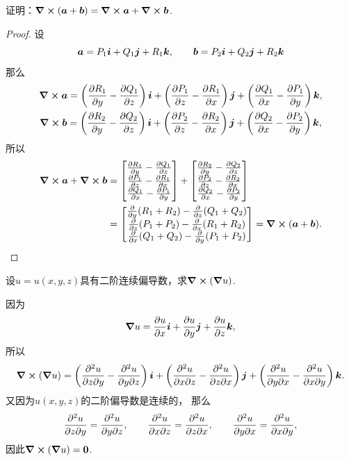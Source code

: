 \begin{example}
证明：\(\curl(\boldsymbol{a}+\boldsymbol{b}) = \curl\boldsymbol{a} + \curl\boldsymbol{b}\).
\begin{proof}
设\begin{equation*}
	\boldsymbol{a}=P_1\boldsymbol{i}+Q_1\boldsymbol{j}+R_1\boldsymbol{k}, \qquad
	\boldsymbol{b}=P_2\boldsymbol{i}+Q_2\boldsymbol{j}+R_2\boldsymbol{k}
\end{equation*}
那么\begin{gather*}
	\curl{\boldsymbol{a}}
	=\left( \pdv{R_1}{y} - \pdv{Q_1}{z} \right)\boldsymbol{i}
	+\left( \pdv{P_1}{z} - \pdv{R_1}{x} \right)\boldsymbol{j}
	+\left( \pdv{Q_1}{x} - \pdv{P_1}{y} \right)\boldsymbol{k}, \\
	\curl{\boldsymbol{b}}
	=\left( \pdv{R_2}{y} - \pdv{Q_2}{z} \right)\boldsymbol{i}
	+\left( \pdv{P_2}{z} - \pdv{R_2}{x} \right)\boldsymbol{j}
	+\left( \pdv{Q_2}{x} - \pdv{P_2}{y} \right)\boldsymbol{k},
\end{gather*}
所以{\def\arraystretch{1.5}
\begin{align*}
	\curl{\boldsymbol{a}} + \curl{\boldsymbol{b}}
	&= \begin{bmatrix}
		\pdv{R_1}{y} - \pdv{Q_1}{z} \\
		\pdv{P_1}{z} - \pdv{R_1}{x} \\
		\pdv{Q_1}{x} - \pdv{P_1}{y}
	\end{bmatrix}
	+ \begin{bmatrix}
		\pdv{R_2}{y} - \pdv{Q_2}{z} \\
		\pdv{P_2}{z} - \pdv{R_2}{x} \\
		\pdv{Q_2}{x} - \pdv{P_2}{y}
	\end{bmatrix} \\
	&= \begin{bmatrix}
		\pdv{y}(R_1+R_2) - \pdv{z}(Q_1+Q_2) \\
		\pdv{z}(P_1+P_2) - \pdv{x}(R_1+R_2) \\
		\pdv{x}(Q_1+Q_2) - \pdv{y}(P_1+P_2)
	\end{bmatrix}
	= \curl(\boldsymbol{a}+\boldsymbol{b}).
	\qedhere
\end{align*}}
\end{proof}
\end{example}

\begin{example}
设\(u = u(x,y,z)\)具有二阶连续偏导数，求\(\curl(\grad u)\).
\begin{solution}
因为\begin{equation*}
	\grad u = \pdv{u}{x} \boldsymbol{i} + \pdv{u}{y} \boldsymbol{j} + \pdv{u}{z} \boldsymbol{k},
\end{equation*}
所以\begin{equation*}
	\curl(\grad u)
	= \left( \pdv[2]{u}{z}{y} - \pdv[2]{u}{y}{z} \right) \boldsymbol{i}
	+ \left( \pdv[2]{u}{x}{z} - \pdv[2]{u}{z}{x} \right) \boldsymbol{j}
	+ \left( \pdv[2]{u}{y}{x} - \pdv[2]{u}{x}{y} \right) \boldsymbol{k}.
\end{equation*}
又因为\(u(x,y,z)\)的二阶偏导数是连续的，
那么\begin{equation*}
	\pdv[2]{u}{z}{y} = \pdv[2]{u}{y}{z},
	\qquad
	\pdv[2]{u}{x}{z} = \pdv[2]{u}{z}{x},
	\qquad
	\pdv[2]{u}{y}{x} = \pdv[2]{u}{x}{y},
\end{equation*}
因此\(\curl(\grad u) = \boldsymbol{0}\).
\end{solution}
\end{example}

